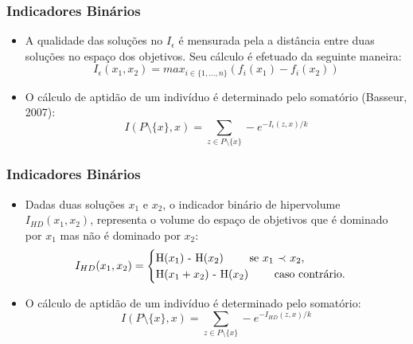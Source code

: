 \documentclass{beamer}
\begin{document}
\begin{frame}
 \frametitle{Indicadores Binários}
 \begin{itemize}
  \item A qualidade das soluções no $I_{\epsilon}$ é mensurada pela a distância entre duas soluções no espaço dos objetivos. Seu cálculo é efetuado da seguinte maneira: 
 \begin{equation}
 \label{eq:indicadorepsilon}
 I_{\epsilon}(x_1, x_2) = max_{i \in \{1,...,n\}}(f_i(x_1)-f_i(x_2))
 \end{equation}
  \item O cálculo de aptidão de um indivíduo é determinado pelo somatório (Basseur, 2007):
  \begin{equation}
\label{eq:indicador3}
I(P\setminus\{x\},x) = \sum_{z \in P \setminus \{x\}} -e^{-I_{\epsilon}(z,x)/k}
\end{equation}
 \end{itemize}
  
\end{frame}

\begin{frame}
 \frametitle{Indicadores Binários}
 \begin{itemize}
  \item Dadas duas soluções $x_1$ e $x_2$, o indicador binário de hipervolume $I_{HD}(x_1,x_2)$, representa o volume do espaço de objetivos que é dominado por $x_1$ mas 
  não é dominado por $x_2$: 
 \begin{equation}
 \label{eq:indicadorhd}
 I_{HD}(x_1, x_2) = \begin{cases}
          $H${(x_1)}$ - H$(x_2)$$ \qquad \textrm{ se $x_1$ $\prec$ $x_2$},\\
          $H$(x_1+x_2)$ - H$(x_2)$$ \qquad \textrm{ caso contrário.}
             \end{cases}
\end{equation}
  \item O cálculo de aptidão de um indivíduo é determinado pelo somatório:
  \begin{equation}
\label{eq:indicador3}
I(P\setminus\{x\},x) = \sum_{z \in P \setminus \{x\}} -e^{-I_{HD}(z,x)/k}
\end{equation}
 \end{itemize}
  
\end{frame}
\end{document}
